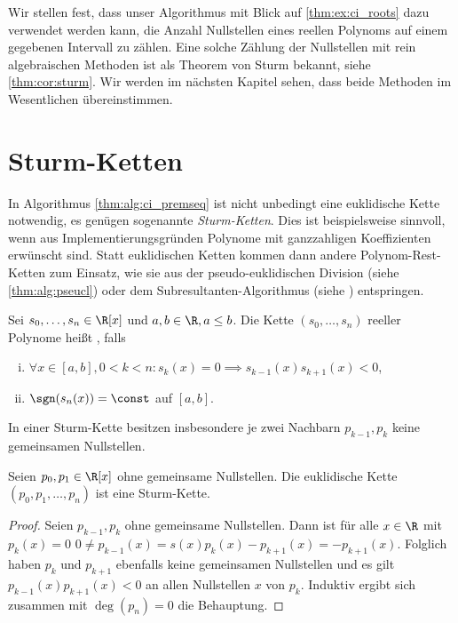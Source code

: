 \documentclass{mythesis}
\begin{document}
Wir stellen fest, dass unser Algorithmus mit Blick auf \ref{thm:ex:ci_roots} dazu verwendet werden kann, die Anzahl Nullstellen eines reellen Polynoms auf einem gegebenen Intervall zu zählen.
Eine solche Zählung der Nullstellen mit rein algebraischen Methoden ist als Theorem von Sturm bekannt, siehe \ref{thm:cor:sturm}.
Wir werden im nächsten Kapitel sehen, dass beide Methoden im Wesentlichen übereinstimmen.

\section{Sturm-Ketten}

In Algorithmus \ref{thm:alg:ci_premseq} ist nicht unbedingt eine euklidische Kette notwendig, es genügen sogenannte \emph{Sturm-Ketten}.
Dies ist beispielsweise sinnvoll, wenn aus Implementierungsgründen Polynome mit ganzzahligen Koeffizienten erwünscht sind.
Statt euklidischen Ketten kommen dann andere Polynom-Rest-Ketten zum Einsatz, wie sie aus der pseudo-euklidischen Division (siehe \ref{thm:alg:pseucl}) oder dem Subresultanten-Algorithmus (siehe \cite[§3.5]{yap2000fundamental}) entspringen.

\begin{definition}
    Sei $s_0, \dotsc, s_n \in \R[x]$ und $a,b \in \R, a \le b$.
    Die Kette $(s_0, \dotsc, s_n)$ reeller Polynome heißt , falls
    \begin{enumerate}[i)]
        \item
            $\forall x \in [a,b], 0 < k < n: s_k(x) = 0 \implies s_{k-1}(x) s_{k+1}(x) < 0$,
        \item
            $\sgn(s_n(x)) = \const$ auf $[a,b]$.
    \end{enumerate}
    \begin{note}
        In einer Sturm-Kette besitzen insbesondere je zwei Nachbarn $p_{k-1}, p_k$ keine gemeinsamen Nullstellen.
    \end{note}
\end{definition}

\begin{example}
    Seien $p_0, p_1 \in \R[x]$ ohne gemeinsame Nullstellen.
    Die euklidische Kette $(p_0, p_1, \dotsc, p_n)$ ist eine Sturm-Kette.
    \begin{proof}
        Seien $p_{k-1}, p_k$ ohne gemeinsame Nullstellen.
        Dann ist für alle $x \in \R$ mit $p_k(x) = 0$
        \begin{math}
            0 \neq p_{k-1}(x)
            = s(x) p_k(x) - p_{k+1}(x)
            = - p_{k+1}(x).
        \end{math}
        Folglich haben $p_k$ und $p_{k+1}$ ebenfalls keine gemeinsamen Nullstellen und es gilt $p_{k-1}(x) p_{k+1}(x) < 0$ an allen Nullstellen $x$ von $p_k$.
        Induktiv ergibt sich zusammen mit $\deg(p_n) = 0$ die Behauptung.
    \end{proof}
\end{example}
\end{document}
